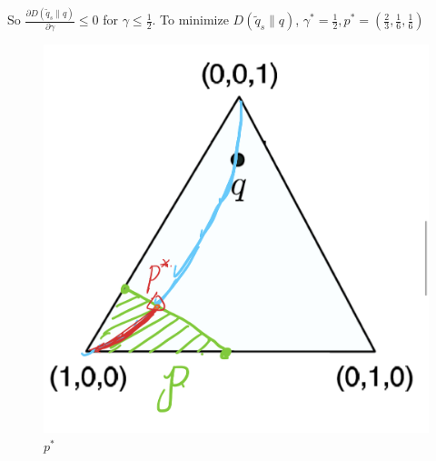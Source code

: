 \documentclass[a4paper]{article}
\begin{document}
\begin{enumerate}
\begin{enumerate}
  So $\frac{\partial D(\tilde{q}_s \| q)}{\partial \gamma} \leqslant 0$ for $\gamma \leqslant \frac{1}{2}$. To minimize $D(\tilde{q}_s \| q)$, $\gamma^* = \frac{1}{2}, p^* = (\frac{2}{3},\frac{1}{6},\frac{1}{6})$

  \begin{figure}[!htbp]
    \centering
    \includegraphics[width = 0.3\linewidth]{3-6.jpg}
    \caption{$p^*$}
    \label{fig:3-6å}
  \end{figure}
\end{enumerate}

  
\end{enumerate}
  

  
\end{document}
